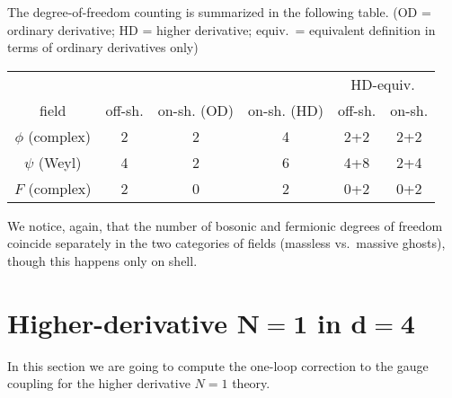 The degree-of-freedom counting is summarized in the following table.
 (OD = ordinary derivative; HD = higher derivative; equiv.\ = equivalent definition in terms of ordinary derivatives only)
\begin{table}[!ht]
\centering
\begin{tabular}{cccccc}
\hline \hline
  &   &   &   & \multicolumn{2}{c}{HD-equiv.} \\ 
field & off-sh.  & on-sh. (OD) & on-sh. (HD) & off-sh. & on-sh. \\  [0.75ex]
$\phi$ (complex) & 2 & 2 & 4 & 2+2 & 2+2 \\ 
$\psi$ (Weyl) & 4 & 2 & 6 & 4+8 & 2+4 \\ 
$F$ (complex) & 2 & 0 & 2 & 0+2 & 0+2 \\ 
\hline \hline 
\end{tabular} 
\end{table}






We notice, again, that the number of bosonic and fermionic degrees of freedom coincide separately in the two categories of fields (massless vs.\ massive ghosts), though this happens only on shell.





\section[Higher-derivative \texorpdfstring{${ N=1}$}{N=1} \sym{} in \texorpdfstring{${ d=4}$}{d=4}]{Higher-derivative \texorpdfstring{$\boldsymbol{ N=1}$}{N=1} \sym{} in \texorpdfstring{$\boldsymbol{ d=4}$}{d=4}}





In this section we are going to compute the one-loop correction to the gauge coupling for the higher derivative $N=1$ \sym{} theory. 



